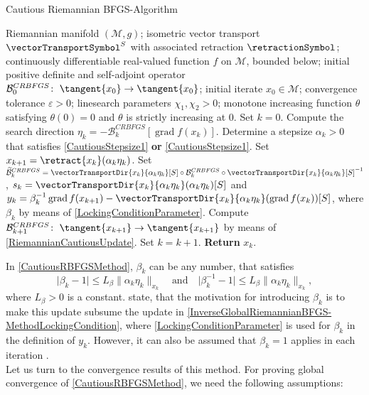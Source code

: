 \begin{algorithm}[H]
	\caption{Cautious Riemannian BFGS-Algorithm}\label{CautiousRBFGSMethod}
	\begin{algorithmic}[1]
        \State Riemannian manifold $(\mathcal{M}, g)$; isometric vector transport $\vectorTransportSymbol^S$ with associated retraction $\retractionSymbol$; continuously differentiable real-valued function $f$ on $\mathcal{M}$, bounded below; initial positive definite and self-adjoint operator $\mathcal{B}^{CRBFGS}_0 \colon \; \tangent{x_0} \to \tangent{x_0}$; initial iterate $x_0 \in \mathcal{M}$; convergence tolerance $\varepsilon > 0$; linesearch parameters $\chi_1, \chi_2 > 0$; monotone increasing function $\theta$ satisfying $\theta(0) = 0$ and $\theta$ is strictly increasing at $0$. Set $k = 0$.
            \State Compute the search direction $\eta_k = - \mathcal{B}^{CRBFGS}_k [\operatorname{grad} f(x_k)]$.
            \State Determine a stepsize $\alpha_k > 0$ that satisfies \cref{CautiousStepsize1} \textbf{or} \cref{CautiousStepsize1}.
            \State Set $x_{k+1} = \retract{x_k}(\alpha_k \eta_k)$.
            \State Set $\widetilde{\mathcal{B}}^{CRBFGS}_k = \vectorTransportDir{x_k}{\alpha_k \eta_k}[S] \circ \mathcal{B}^{CRBFGS}_k \circ {\vectorTransportDir{x_k}{\alpha_k \eta_k}[S]}^{-1}$, $s_k = \vectorTransportDir{x_k}{\alpha_k \eta_k}(\alpha_k \eta_k)[S]$ and 
            \StatexIndent[2] $y_k = \beta^{-1}_k \operatorname{grad} f(x_{k+1}) - \vectorTransportDir{x_k}{\alpha_k \eta_k}(\operatorname{grad} f(x_k))[S]$, where $\beta_k$ by means of \cref{LockingConditionParameter}.
            \State Compute $\mathcal{B}^{CRBFGS}_{k+1} \colon \; \tangent{x_{k+1}} \to \tangent{x_{k+1}}$ by means of \cref{RiemannianCautiousUpdate}. 
			\State Set $k = k+1$.
		\EndWhile
		\State \textbf{Return} $x_k$.
    \end{algorithmic}
\end{algorithm}

In \cref{CautiousRBFGSMethod}, $\beta_k$ can be any number, that satisfies
\begin{equation*}
    \lvert \beta_k - 1 \rvert \leq L_{\beta} \lVert \alpha_k \eta_k \rVert_{x_k} \quad \text{and} \quad \lvert \beta^{-1}_k - 1 \rvert \leq L_{\beta} \lVert \alpha_k \eta_k \rVert_{x_k},
\end{equation*}
where $L_{\beta} > 0$ is a constant. \cite{HuangAbsilGallivan:2018} state, that the motivation for introducing $\beta_k$ is to make this update subsume the update in \cref{InverseGlobalRiemannianBFGS-MethodLockingCondition}, where \cref{LockingConditionParameter} is used for $\beta_k$ in the definition of $y_k$. However, it can also be assumed that $\beta_k = 1$ applies in each iteration \cite[p.~473]{HuangAbsilGallivan:2018}. \\ 
Let us turn to the convergence results of this method. For proving global convergence of \cref{CautiousRBFGSMethod}, we need the following assumptions:


